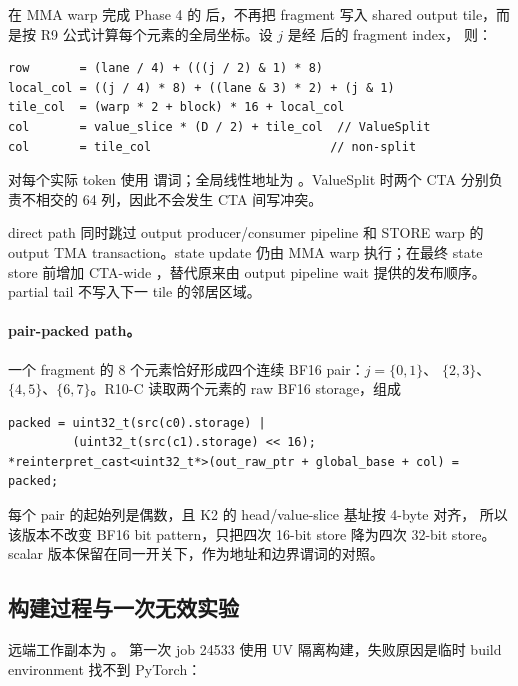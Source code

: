 在 MMA warp 完成 Phase 4 的  后，不再把 fragment 写入
shared output tile，而是按 R9 公式计算每个元素的全局坐标。设
\(j\) 是经  后的 fragment index，
则：

\begin{lstlisting}
row       = (lane / 4) + (((j / 2) & 1) * 8)
local_col = ((j / 4) * 8) + ((lane & 3) * 2) + (j & 1)
tile_col  = (warp * 2 + block) * 16 + local_col
col       = value_slice * (D / 2) + tile_col  // ValueSplit
col       = tile_col                         // non-split
\end{lstlisting}

对每个实际 token 使用  谓词；全局线性地址为
。ValueSplit
时两个 CTA 分别负责不相交的 64 列，因此不会发生 CTA 间写冲突。

direct path 同时跳过 output producer/consumer pipeline 和 STORE warp 的
output TMA transaction。state update 仍由 MMA warp 执行；在最终 state store
前增加 CTA-wide ，替代原来由 output pipeline wait
提供的发布顺序。partial tail 不写入下一 tile 的邻居区域。

\paragraph{pair-packed path。}

一个 fragment 的 8 个元素恰好形成四个连续 BF16 pair：\(j=\{0,1\}\)、
\(\{2,3\}\)、\(\{4,5\}\)、\(\{6,7\}\)。R10-C 读取两个元素的 raw
BF16 storage，组成

\begin{lstlisting}
packed = uint32_t(src(c0).storage) |
         (uint32_t(src(c1).storage) << 16);
*reinterpret_cast<uint32_t*>(out_raw_ptr + global_base + col) = packed;
\end{lstlisting}

每个 pair 的起始列是偶数，且 K2 的 head/value-slice 基址按 4-byte 对齐，
所以该版本不改变 BF16 bit pattern，只把四次 16-bit store 降为四次 32-bit
store。scalar 版本保留在同一开关下，作为地址和边界谓词的对照。

\subsection{构建过程与一次无效实验}

远端工作副本为
。
第一次 job 24533 使用 UV 隔离构建，失败原因是临时 build environment 找不到
PyTorch：


